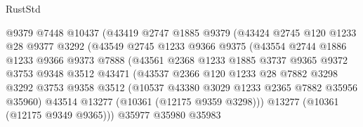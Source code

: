 \begin{lexlean}{RustStd}
\begin{coremodule}
                              @9379
                              @7448
                              @10437
                              (@43419
                                @2747
                                @1885
                                @9379
                                (@43424
                                  @2745
                                  @120
                                  @1233
                                  @28
                                  @9377
                                  @3292
                                  (@43549
                                    @2745
                                    @1233
                                    @9366
                                    @9375
                                    (@43554
                                      @2744
                                      @1886
                                      @1233
                                      @9366
                                      @9373
                                      @7888
                                      (@43561
                                        @2368
                                        @1233
                                        @1885
                                        @3737
                                        @9365
                                        @9372
                                        @3753
                                        @9348
                                        @3512
                                        @43471
                                        (@43537
                                          @2366
                                          @120
                                          @1233
                                          @28
                                          @7882
                                          @3298
                                          @3292
                                          @3753
                                          @9358
                                          @3512
                                          (@10537 @43380 @3029 @1233 @2365 @7882 @35956 @35960)
                                          @43514
                                          @13277
                                          (@10361 (@12175 @9359 @3298)))
                                        @13277
                                        (@10361 (@12175 @9349 @9365)))
                                      @35977
                                      @35980
                                      @35983

\end{coremodule}
\end{lexlean}
